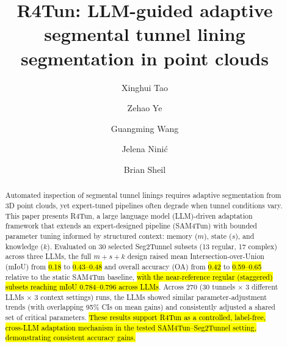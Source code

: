 \documentclass[a4paper,fleqn]{cas-dc}
\begin{document}
\let\WriteBookmarks\relax
\def\floatpagepagefraction{1}
\def\textpagefraction{.001}




{

\title[mode=title]{R4Tun: LLM-guided adaptive segmental tunnel lining segmentation in point clouds}

\author[1]{Xinghui Tao}

\author[2]{Zehao Ye}


\author[1]{Guangming Wang}
\cormark[1]

\author[2]{Jelena Nini\'{c}}

\author[1]{Brian Sheil}






\begin{abstract}
Automated inspection of segmental tunnel linings requires adaptive segmentation from 3D point clouds, yet expert-tuned pipelines often degrade when tunnel conditions vary. This paper presents R4Tun, a large language model (LLM)-driven adaptation framework that extends an expert-designed pipeline (SAM4Tun) with bounded parameter tuning informed by structured context: memory ($m$), state ($s$), and knowledge ($k$). Evaluated on 30 selected Seg2Tunnel subsets (13 regular, 17 complex) across three LLMs, the full $m+s+k$ design raised mean Intersection-over-Union (mIoU) from \hl{0.18} to \hl{0.43--0.48} and overall accuracy (OA) from \hl{0.42} to \hl{0.59--0.65} relative to the static SAM4Tun baseline, \hl{with the near-reference regular (staggered) subsets reaching mIoU 0.784--0.796 across LLMs}. Across 270 (30 tunnels $\times$ 3 different LLMs $\times$ 3 context settings) runs, the LLMs showed similar parameter-adjustment trends (with overlapping 95\% CIs on mean gains) and consistently adjusted a shared set of critical parameters. \hl{These results support R4Tun as a controlled, label-free, cross-LLM adaptation mechanism in the tested SAM4Tun--Seg2Tunnel setting, demonstrating consistent accuracy gains.}
\end{abstract}


}
\end{document}
